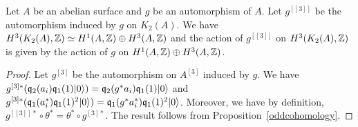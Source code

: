 \begin{cor}\label{actionH3}
Let $A$ be an abelian surface and $g$ be an automorphism of $A$. Let $g^{[[3]]}$ be the automorphism induced by $g$ on $K_2(A)$.
We have $H^3(K_2(A),\mathbb{Z})\simeq H^1(A,\mathbb{Z})\oplus H^3(A,\mathbb{Z})$ and the action of $g^{[[3]]}$ on $H^3(K_2(A),\mathbb{Z})$ is given by the action of $g$ on $H^1(A,\mathbb{Z})\oplus H^3(A,\mathbb{Z})$.
\end{cor}
\begin{proof}
Let $g^{[3]}$ be the automorphism on $A^{[3]}$ induced by $g$.
We have $g^{[3]*}(\mathfrak{q}_2(a_i)\mathfrak{q}_1(1)|0\rangle)=\mathfrak{q}_2(g^{*}a_i)\mathfrak{q}_1(1)|0\rangle$ and $g^{[3]*}(\mathfrak{q}_1(a^*_i)\mathfrak{q}_1(1)^2|0\rangle)=\mathfrak{q}_1(g^{*}a^*_i)\mathfrak{q}_1(1)^2|0\rangle$.
Moreover, we have by definition, $g^{[[3]]*}\circ \theta^{*}=\theta^{*}\circ g^{[3]*}$.
The result follows from Proposition~\ref{oddcohomology}.
\end{proof}
